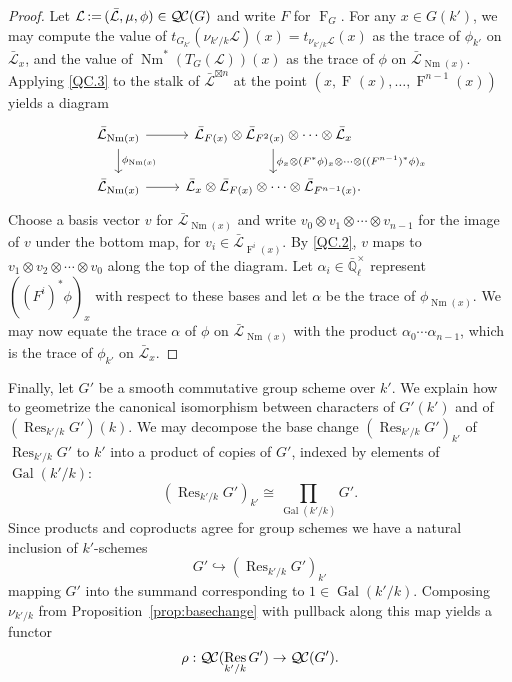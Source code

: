 \documentclass[CM,Submssn,SecEq]{degruyter-crelle} %
\theoremstyle{plain}
\theoremstyle{definition}
\theoremstyle{remark}
\newcommand{\EE}{\mathbb{\bar Q}_\ell}
\newcommand{\EEx}{\EE^\times}
\DeclareMathOperator{\Gal}{Gal}
\newcommand{\Frob}[1]{\operatorname{F}_{#1}}
\DeclareMathOperator{\Res}{Res}
\DeclareMathOperator{\Nm}{Nm}
\newcommand{\ceq}{{\, :=\, }}
\newcommand{\TrFrob}[1]{T_{#1}}
\newcommand{\qcs}[1]{{\mathcal{#1}}}
\newcommand{\gqcs}[1]{{\mathcal{\bar #1}}}
\newcommand{\QC}{{\mathcal{Q\hskip-0.8pt C}}}
\begin{document}
\begin{proof}
Let $\qcs{L} \ceq (\gqcs{L}, \mu, \phi) \in \QC(G)$ and write $F$ for $\Frob{G}$.  For any $x \in G(k')$,
we may compute the value of $t_{G_{k'}}(\nu_{k'/k}\qcs{L})(x)= t_{\nu_{k'/k}\qcs{L}}(x)$ as the trace of $\phi_{k'}$ on $\gqcs{L}_x$,
and the value of $\Nm^*(\TrFrob{G}(\qcs{L}))(x)$ as the trace of $\phi$ on $\gqcs{L}_{\Nm(x)}$.
Applying \ref{QC.3} to the stalk of $\gqcs{L}^{\boxtimes n}$ at the point $(x, \Frob{}(x), \ldots, \Frob{}^{n-1}(x))$ yields a diagram
\[
\begin{tikzcd}
\gqcs{L}_{\Nm(x)} \rar \dar{\phi_{\Nm(x)}} & \gqcs{L}_{F(x)} \otimes \gqcs{L}_{F^2(x)} \otimes \cdots \otimes \gqcs{L}_x
\dar{\phi_x \otimes (F^*\phi)_x \otimes \cdots \otimes ((F^{n-1})^*\phi)_x} \\
\gqcs{L}_{\Nm(x)} \rar & \gqcs{L}_x \otimes \gqcs{L}_{F(x)} \otimes \cdots \otimes \gqcs{L}_{F^{n-1}(x)}.
\end{tikzcd}
\]
Choose a basis vector $v$ for $\gqcs{L}_{\Nm(x)}$ and write $v_0 \otimes v_1 \otimes \cdots \otimes v_{n-1}$ for the image of $v$ under the
bottom map,
for $v_i \in \gqcs{L}_{\Frob{}^i(x)}$.  By \ref{QC.2}, $v$ maps to
$v_1 \otimes v_2 \otimes \cdots \otimes v_0$ along the top of the diagram.
Let $\alpha_i \in \EEx$ represent $((F^i)^*\phi)_x$ with respect to these bases and let $\alpha$ be
the trace of $\phi_{\Nm(x)}$.  We may now equate the trace $\alpha$ of $\phi$ on $\gqcs{L}_{\Nm(x)}$
with the product $\alpha_0 \cdots \alpha_{n-1}$, which is the trace of $\phi_{k'}$ on $\gqcs{L}_x$.
\end{proof}

Finally, let $G'$ be a smooth commutative group scheme over $k'$.
We explain how to geometrize the canonical isomorphism between characters of $G'(k')$ and of $(\Res_{k'/k}G')(k)$.
We may decompose the base change $(\Res_{k'/k}G')_{k'}$ of $\Res_{k'/k}G'$ to $k'$
into a product of copies of $G'$, indexed by elements of $\Gal(k'/k)$:
\[
(\Res_{k'/k}G')_{k'} \cong \prod_{\Gal(k'/k)} G'.
\]
Since products and coproducts agree for group schemes we have a natural inclusion of $k'$-schemes
\[
G' \hookrightarrow (\Res_{k'/k}G')_{k'}
\]
mapping $G'$ into the summand corresponding to $1 \in \Gal(k'/k)$.  Composing $\nu_{k'/k}$
from Proposition~\ref{prop:basechange} with pullback along this map yields a functor
\[
\rho : \QC(\Res_{k'/k}G') \to \QC(G').
\]
\end{document}
